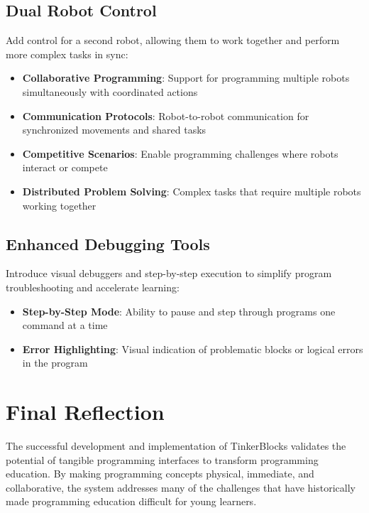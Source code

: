 \subsection{Dual Robot Control}

Add control for a second robot, allowing them to work together and perform more complex tasks in sync:

\begin{itemize}
    \item \textbf{Collaborative Programming}: Support for programming multiple robots simultaneously with coordinated actions
    \item \textbf{Communication Protocols}: Robot-to-robot communication for synchronized movements and shared tasks
    \item \textbf{Competitive Scenarios}: Enable programming challenges where robots interact or compete
    \item \textbf{Distributed Problem Solving}: Complex tasks that require multiple robots working together
\end{itemize}

\subsection{Enhanced Debugging Tools}

Introduce visual debuggers and step-by-step execution to simplify program troubleshooting and accelerate learning:

\begin{itemize}
    \item \textbf{Step-by-Step Mode}: Ability to pause and step through programs one command at a time
    \item \textbf{Error Highlighting}: Visual indication of problematic blocks or logical errors in the program
\end{itemize}

\section{Final Reflection}

The successful development and implementation of TinkerBlocks validates the potential of tangible programming interfaces to transform programming education. By making programming concepts physical, immediate, and collaborative, the system addresses many of the challenges that have historically made programming education difficult for young learners.

